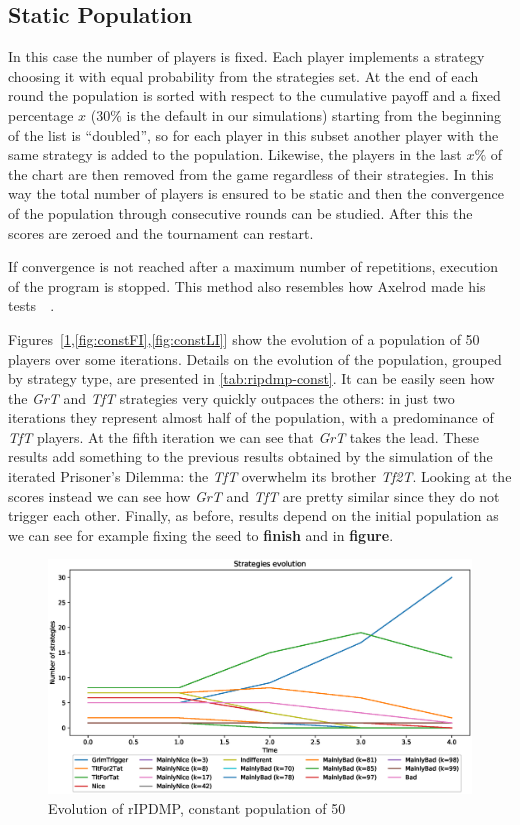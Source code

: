 \documentclass[journal,10pt,twoside]{IEEEtran}
\begin{document}
\subsection{Static Population}
In this case the number of players is fixed. Each player implements a strategy choosing it with equal probability from the strategies set. At the end of each round the population is sorted with respect to the cumulative payoff and a fixed percentage $x$ ($30\%$ is the default in our simulations) starting from the beginning of the list is ``doubled'', so for each player in this subset another player with the same strategy is added to the population. Likewise, the players in the last $x\%$ of the chart are then removed from the game regardless of their strategies. In this way the total number of players is ensured to be static and then the convergence of the population through consecutive rounds can be studied. After this the scores are zeroed and the tournament can restart.

If convergence is not reached after a maximum number of repetitions, execution of the program is stopped.
This method also resembles how Axelrod made his tests~\cite[\S 2.6]{mathieu2017}~\cite{axelrod1984evolution}.

Figures~[\ref{fig:constR},\ref{fig:constFI},\ref{fig:constLI}] show the evolution of a population of 50 players over some iterations.
Details on the evolution of the population, grouped by strategy type, are presented in \autoref{tab:ripdmp-const}.
It can be easily seen how the \textit{GrT} and \textit{TfT} strategies very quickly outpaces the others: in just two iterations they represent almost half of the population, with a predominance of \textit{TfT} players. At the fifth iteration we can see that \textit{GrT} takes the lead.
These results add something to the previous results obtained by the simulation of the iterated Prisoner's Dilemma: the \textit{TfT} overwhelm its brother \textit{Tf2T}. Looking at the scores instead we can see how \textit{GrT} and \textit{TfT} are pretty similar since they do not trigger each other. Finally, as before, results depend on the initial population as we can see for example fixing the seed to \textbf{finish} and in \textbf{figure}.

\begin{figure}[!ht]
    \centering
    \includegraphics[width=1\columnwidth]{../img/ripdmp-const/ripdmp-evolution-const-pop-50}
    \caption{Evolution of rIPDMP, constant population of 50}
    \label{fig:constR}
\end{figure}
\end{document}
